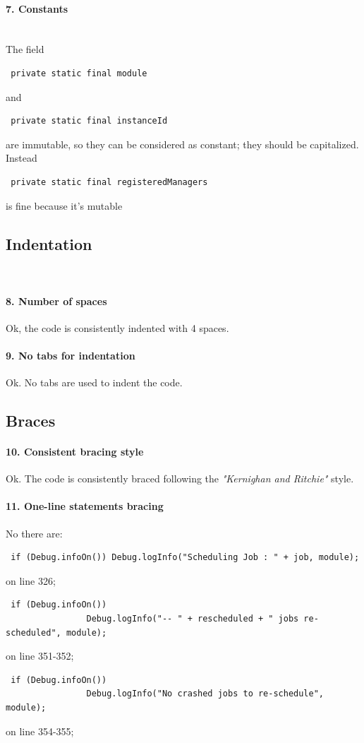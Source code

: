 \documentclass[english]{article}
\begin{document}
\paragraph{7. Constants}\\
The field \begin{lstlisting} private static final module \end{lstlisting} and \begin{lstlisting} private static final instanceId \end{lstlisting} are immutable, 
so they can be considered as constant; they should be capitalized. Instead \begin{lstlisting} private static final registeredManagers \end{lstlisting} is fine because it's mutable


\subsection{Indentation}\\

\paragraph{8. Number of spaces}
Ok, the code is consistently indented with 4 spaces.

\paragraph{9. No tabs for indentation}
Ok. No tabs are used to indent the code.

\subsection{Braces}

\paragraph{10. Consistent bracing style}
Ok.
The code is consistently braced following the \textit{"Kernighan and Ritchie"} style.

\paragraph{11. One-line statements bracing}
No there are:
\begin{itemize}
	\begin{lstlisting} if (Debug.infoOn()) Debug.logInfo("Scheduling Job : " + job, module); \end{lstlisting} on line 326;
	\begin{lstlisting} if (Debug.infoOn())
                Debug.logInfo("-- " + rescheduled + " jobs re-scheduled", module); \end{lstlisting} on line 351-352;
    \begin{lstlisting} if (Debug.infoOn())
                Debug.logInfo("No crashed jobs to re-schedule", module); \end{lstlisting} on line 354-355;
\end{itemize}
\end{document}
